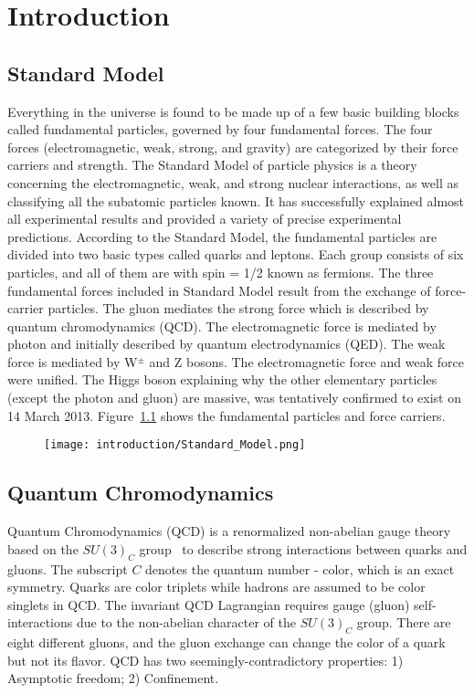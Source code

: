 ﻿\chapter{Introduction}
\label{chap:introduction}

\section{Standard Model}
Everything in the universe is found to be made up of a few basic building blocks called fundamental particles, governed by four fundamental forces. The four forces (electromagnetic, weak, strong, and gravity) are categorized by their force carriers and strength. The Standard Model of particle physics is a theory concerning the electromagnetic, weak, and strong nuclear interactions, as well as classifying all the subatomic particles known. It has successfully explained almost all experimental results and provided a variety of precise experimental predictions. According to the Standard Model, the fundamental particles are divided into two basic types called quarks and leptons. Each group consists of six particles, and all of them are with spin = 1/2 known as fermions. The three fundamental forces included in Standard Model result from the exchange of force-carrier particles. The gluon mediates the strong force which is described by quantum chromodynamics (QCD). The electromagnetic force is mediated by photon and initially described by quantum electrodynamics (QED). The weak force is mediated by W$^{\pm}$ and Z bosons. The electromagnetic force and weak force were unified. The Higgs boson explaining why the other elementary particles (except the photon and gluon) are massive, was tentatively confirmed to exist on 14 March 2013. Figure~\ref{standardModel} shows the fundamental particles and force carriers.

\begin{figure}[htbp]
\centering
\texttt{[image: introduction/Standard\_Model.png]}
 \label{standardModel}
\end{figure}

\section{Quantum Chromodynamics}
Quantum Chromodynamics (QCD) is a renormalized non-abelian gauge theory based on the $SU(3)_{C}$ group~\cite{QCDtheory} to describe strong interactions between quarks and gluons. The subscript $C$ denotes the quantum number - color, which is an exact symmetry. Quarks are color triplets while hadrons are assumed to be color singlets in QCD. The invariant QCD Lagrangian requires gauge (gluon) self-interactions due to the non-abelian character of the $SU(3)_{C}$ group. There are eight different gluons, and the gluon exchange can change the color of a quark but not its ﬂavor. QCD has two seemingly-contradictory properties: 1) Asymptotic freedom; 2) Confinement.

